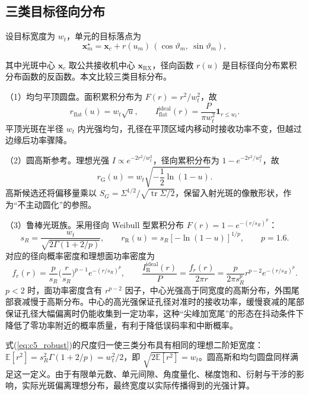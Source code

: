 \subsection{三类目标径向分布}

设目标宽度为 $w_t$，单元的目标落点为
\begin{equation}
\mathbf x_m^\star=\mathbf x_c+r(u_m)\,(\cos\vartheta_m,\ \sin\vartheta_m),
\label{eq:c5_target}
\end{equation}

其中光斑中心 $\mathbf x_c$ 取公共接收机中心 $\mathbf x_{\mathrm{RX}}$，径向函数 $r(u)$ 是目标径向分布累积分布函数的反函数。本文比较三类目标分布。

（1）均匀平顶圆盘。面积累积分布为 $F(r)=r^2/w_t^2$，故
\begin{equation}
r_{\mathrm{flat}}(u)=w_t\sqrt u,\qquad
I_{\mathrm{flat}}^{\mathrm{ideal}}(r)=\frac{P}{\pi w_t^2}\mathbf 1_{r\le w_t}.
\label{eq:c5_flat}
\end{equation}
平顶光斑在半径 $w_t$ 内光强均匀，孔径在平顶区域内移动时接收功率不变，但越过边缘后功率骤降。

（2）圆高斯参考。理想光强 $I\propto e^{-2r^2/w_t^2}$，径向累积分布为 $1-e^{-2r^2/w_t^2}$，故
\begin{equation}
r_{\mathrm G}(u)=w_t\sqrt{-\frac12\ln(1-u)}.
\label{eq:c5_gauss}
\end{equation}
高斯候选还将偏移量乘以 $S_G=\Sigma^{1/2}/\sqrt{\operatorname{tr}\Sigma/2}$，保留入射光斑的像散形状，作为“不主动圆化”的参照。

（3）鲁棒光斑族。采用径向 Weibull 型累积分布 $F(r)=1-e^{-(r/s_R)^p}$：
\begin{equation}
s_R=\frac{w_t}{\sqrt{2\Gamma(1+2/p)}},\qquad
r_{\mathrm R}(u)=s_R\left[-\ln(1-u)\right]^{1/p},\qquad p=1.6.
\label{eq:c5_robust}
\end{equation}
对应的径向概率密度和理想面功率密度为
\begin{equation}
f_r(r)=\frac{p}{s_R}\Big(\frac{r}{s_R}\Big)^{p-1}e^{-(r/s_R)^p},\qquad
\frac{I_{\mathrm R}^{\mathrm{ideal}}(r)}{P}=\frac{f_r(r)}{2\pi r}=\frac{p}{2\pi s_R^p}r^{p-2}e^{-(r/s_R)^p}.
\label{eq:c5_robust_density}
\end{equation}
$p<2$ 时，面功率密度含有 $r^{p-2}$ 因子，中心光强高于同宽度的高斯分布，外围尾部衰减慢于高斯分布。中心的高光强保证孔径对准时的接收功率，缓慢衰减的尾部保证孔径大幅偏离时仍能收集到一定功率，这种“尖峰加宽尾”的形态在抖动条件下降低了零功率附近的概率质量，有利于降低误码率和中断概率。

式(\ref{eq:c5_robust})的尺度归一使三类分布具有相同的理想二阶矩宽度：$\mathbb E[r^2]=s_R^2\Gamma(1+2/p)=w_t^2/2$，即 $\sqrt{2\mathbb E[r^2]}=w_t$。圆高斯和均匀圆盘同样满足这一定义。由于有限单元数、单元间隙、角度量化、梯度饱和、衍射与干涉的影响，实际光斑偏离理想分布，最终宽度以实际传播得到的光强计算。

